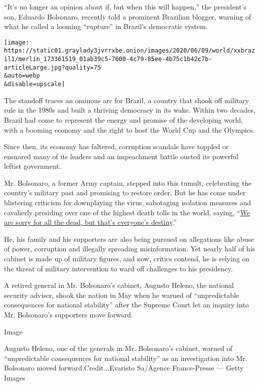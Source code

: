 ``It's no longer an opinion about if, but when this will happen,'' the
president's son, Eduardo Bolsonaro, recently told a prominent Brazilian
blogger, warning of what he called a looming ``rupture'' in Brazil's
democratic system.

\texttt{[image: https://static01.graylady3jvrrxbe.onion/images/2020/06/09/world/xxbrazil1/merlin\_173361519\_01ab39c5-7600-4c79-85ee-4b75c1b42c7b-articleLarge.jpg?quality=75\\\&auto=webp\\\&disable=upscale]}

The standoff traces an ominous arc for Brazil, a country that shook off
military rule in the 1980s and built a thriving democracy in its wake.
Within two decades, Brazil had come to represent the energy and promise
of the developing world, with a booming economy and the right to host
the World Cup and the Olympics.

Since then, its economy has faltered, corruption scandals have toppled
or ensnared many of its leaders and an impeachment battle ousted its
powerful leftist government.

Mr. Bolsonaro, a former Army captain, stepped into this tumult,
celebrating the country's military past and promising to restore order.
But he has come under blistering criticism for downplaying the virus,
sabotaging isolation measures and cavalierly presiding over one of the
highest death tolls in the world, saying,
``\href{https://www.nytimes3xbfgragh.onion/2020/06/04/world/middleeast/coronavirus-egypt-america-africa-asia.html}{We
are sorry for all the dead, but that's everyone's destiny}.''

He, his family and his supporters are also being pursued on allegations
like abuse of power, corruption and illegally spreading misinformation.
Yet nearly half of his cabinet is made up of military figures, and now,
critics contend, he is relying on the threat of military intervention to
ward off challenges to his presidency.

A retired general in Mr. Bolsonaro's cabinet, Augusto Heleno, the
national security adviser, shook the nation in May when he warned of
``unpredictable consequences for national stability'' after the Supreme
Court let an inquiry into Mr. Bolsonaro's supporters move forward.

Image

Augusto Heleno, one of the generals in Mr. Bolsonaro's cabinet, warned
of ``unpredictable consequences for national stability'' as an
investigation into Mr. Bolsonaro moved forward.Credit...Evaristo
Sa/Agence France-Presse --- Getty Images

